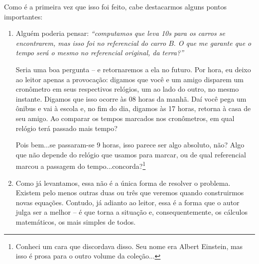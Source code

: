 \begin{exemplo}[Nível I]
Como é a primeira vez que isso foi feito, cabe destacarmos alguns pontos importantes:

\begin{enumerate}
    \item [(i)] Alguém poderia pensar: \textit{``computamos que leva 10s para os carros se encontrarem, mas isso foi no referencial do carro $B.$ O que me garante que o tempo será o mesmo no referencial original, da terra?''}

    Seria uma boa pergunta -- e retornaremos a ela no futuro. Por hora, eu deixo ao leitor apenas a provocação: digamos que você e um amigo disparem um cronômetro em seus respectivos relógios, um ao lado do outro, no mesmo instante. Digamos que isso ocorre às 08 horas da manhã. Daí você pega um ônibus e vai à escola e, no fim do dia, digamos às 17 horas, retorna à casa de seu amigo. Ao comparar os tempos marcados nos cronômetros, em qual relógio terá passado mais tempo?

    Pois bem...se passaram-se 9 horas, isso parece ser algo absoluto, não? Algo que não depende do relógio que usamos para marcar, ou de qual referencial marcou a passagem do tempo...concorda?\footnote{Conheci um cara que discordava disso. Seu nome era Albert Einstein, mas isso é prosa para o outro volume da coleção...}

    \item [(ii)] Como já levantamos, essa não é a única forma de resolver o problema. Existem pelo menos outras duas ou três que veremos quando construirmos novas equações. Contudo, já adianto ao leitor, essa é a forma que o autor julga ser a melhor -- é que torna a situação e, consequentemente, os cálculos matemáticos, os mais simples de todos.
\end{enumerate}


\end{exemplo}



\vspace{0.3cm}






